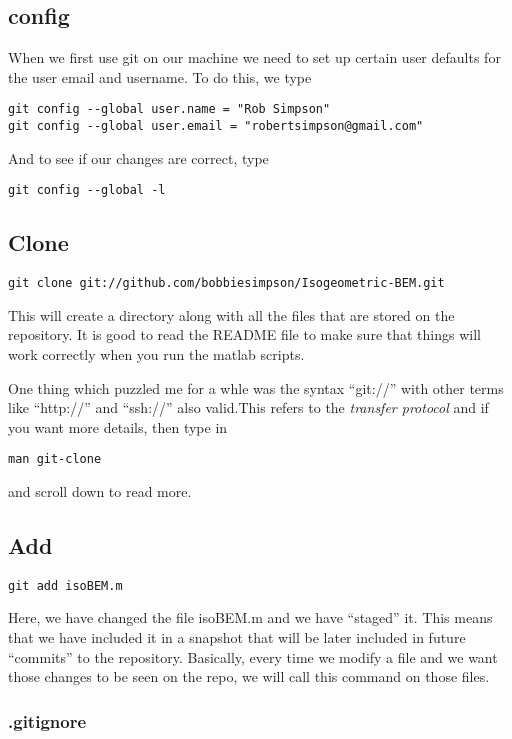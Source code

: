 \documentclass[a4paper, 10pt]{article}
\begin{document}
\subsection*{config}
\label{sec:config}

When we first use git on our machine we need to set up certain user
defaults for the user email and username. To do this, we type
\begin{verbatim}
git config --global user.name = "Rob Simpson"
git config --global user.email = "robertsimpson@gmail.com"
\end{verbatim}
And to see if our changes are correct, type
\begin{verbatim}
git config --global -l
\end{verbatim}

\subsection*{Clone}
\begin{Verbatim}
git clone git://github.com/bobbiesimpson/Isogeometric-BEM.git
\end{Verbatim}

This will create a directory along with all the files that are stored on the repository. It is good to read the README file to make sure that things will work correctly when you run the matlab scripts.

One thing which puzzled me for a whle was the syntax ``git://'' with other terms like ``http://'' and ``ssh://'' also valid.This refers to the  \emph{transfer protocol} and if you want more details, then type in 
\begin{verbatim}
man git-clone
\end{verbatim}
and scroll down to read more.


\subsection*{Add}
\begin{Verbatim}
git add isoBEM.m
\end{Verbatim}

Here, we have changed the file isoBEM.m and we have ``staged'' it. This means that we have included it in a snapshot that will be later included in future ``commits'' to the repository. Basically, every time we modify a file and we want those changes to be seen on the repo, we will call this command on those files.

\subsubsection*{.gitignore}
\label{sec:.gitignore}
\end{document}
